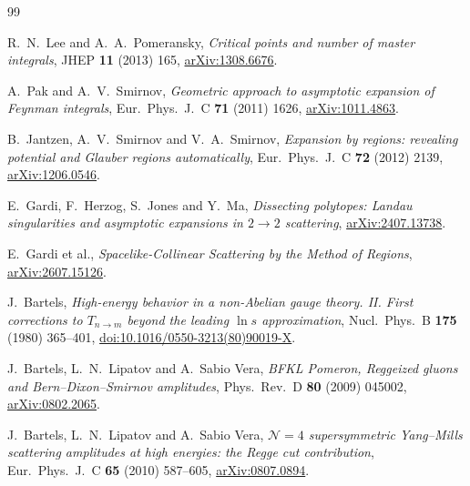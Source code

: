 \documentclass[a4paper,11pt]{article}
\begin{document}
\begin{thebibliography}{99}

R.~N.~Lee and A.~A.~Pomeransky,
\emph{Critical points and number of master integrals},
JHEP \textbf{11} (2013) 165,
\href{https://arxiv.org/abs/1308.6676}{arXiv:1308.6676}.

A.~Pak and A.~V.~Smirnov,
\emph{Geometric approach to asymptotic expansion of Feynman integrals},
Eur.\ Phys.\ J.\ C \textbf{71} (2011) 1626,
\href{https://arxiv.org/abs/1011.4863}{arXiv:1011.4863}.

B.~Jantzen, A.~V.~Smirnov and V.~A.~Smirnov,
\emph{Expansion by regions: revealing potential and Glauber regions
automatically},
Eur.\ Phys.\ J.\ C \textbf{72} (2012) 2139,
\href{https://arxiv.org/abs/1206.0546}{arXiv:1206.0546}.

E.~Gardi, F.~Herzog, S.~Jones and Y.~Ma,
\emph{Dissecting polytopes: Landau singularities and asymptotic expansions
in \(2\to2\) scattering},
\href{https://arxiv.org/abs/2407.13738}{arXiv:2407.13738}.

E.~Gardi et al.,
\emph{Spacelike-Collinear Scattering by the Method of Regions},
\href{https://arxiv.org/abs/2607.15126}{arXiv:2607.15126}.

J.~Bartels,
\emph{High-energy behavior in a non-Abelian gauge theory. II. First
corrections to \(T_{n\to m}\) beyond the leading \(\ln s\) approximation},
Nucl.\ Phys.\ B \textbf{175} (1980) 365--401,
\href{https://doi.org/10.1016/0550-3213(80)90019-X}
{doi:10.1016/0550-3213(80)90019-X}.

J.~Bartels, L.~N.~Lipatov and A.~Sabio Vera,
\emph{BFKL Pomeron, Reggeized gluons and Bern--Dixon--Smirnov amplitudes},
Phys.\ Rev.\ D \textbf{80} (2009) 045002,
\href{https://arxiv.org/abs/0802.2065}{arXiv:0802.2065}.

J.~Bartels, L.~N.~Lipatov and A.~Sabio Vera,
\emph{\(\mathcal N=4\) supersymmetric Yang--Mills scattering amplitudes at
high energies: the Regge cut contribution},
Eur.\ Phys.\ J.\ C \textbf{65} (2010) 587--605,
\href{https://arxiv.org/abs/0807.0894}{arXiv:0807.0894}.

\end{thebibliography}
\end{document}
